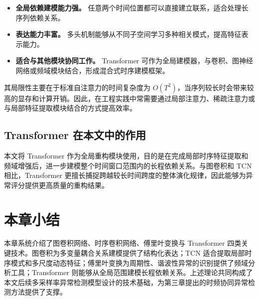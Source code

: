 \begin{itemize}
    \item \textbf{全局依赖建模能力强。} 任意两个时间位置都可以直接建立联系，适合处理长序列依赖关系。
    \item \textbf{表达能力丰富。} 多头机制能够从不同子空间学习多种相关模式，提高特征表示能力。
    \item \textbf{适合与其他模块协同工作。} Transformer 可作为全局建模器，与卷积、图神经网络或频域模块结合，形成混合式时序建模框架。
\end{itemize}

其局限性主要在于标准自注意力的时间复杂度为 $O(T^2)$，当序列较长时会带来较高的显存和计算开销。因此，在工程实践中常需要通过局部注意力、稀疏注意力或与局部特征提取模块结合的方式提高效率。

\subsection{Transformer 在本文中的作用}

本文将 Transformer 作为全局重构模块使用，目的是在完成局部时序特征提取和频域增强后，进一步建模整个时间窗口范围内的长程依赖关系。与图卷积和 TCN 相比，Transformer 更擅长捕捉跨越较长时间跨度的整体演化规律，因此能够为异常评分提供更高质量的重构结果。

\section{本章小结}

本章系统介绍了图卷积网络、时序卷积网络、傅里叶变换与 Transformer 四类关键技术。图卷积为多变量耦合关系建模提供了结构化表达；TCN 适合提取局部时序模式和多尺度动态特征；傅里叶变换为周期性、谐波性异常的识别提供了频域分析工具；Transformer 则能够从全局范围建模长程依赖关系。上述理论共同构成了本文后续多采样率异常检测模型设计的技术基础，为第三章提出的时频协同异常检测方法提供了支撑。
